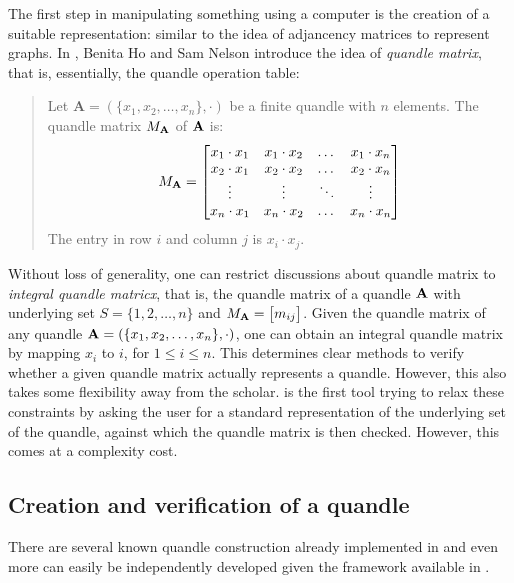 \documentclass{../mcom-l}
\begin{document}
The first step in manipulating something using a computer is the creation of a suitable representation: similar to the idea of adjancency matrices to represent graphs. In \cite{ho2005matrices}, Benita Ho and Sam Nelson introduce the idea of \emph{quandle matrix}, that is, essentially, the quandle operation table:
\begin{quote}
    Let $\mathbf{A}=(\{x_1, x_2, \dots, x_n\}, \cdot)$ be a finite quandle with $n$ elements. \newline 
    The quandle matrix $M_\mathbf{A}$ of $\mathbf{A}$ is:
    \[M_\mathbf{A} = \begin{bmatrix}
 x_1 \cdot x_1 & x_1 \cdot x_2 & \dots & x_1 \cdot x_n \\
 x_2 \cdot x_1 & x_2 \cdot x_2 & \dots & x_2 \cdot x_n\\
 \vdots & \vdots & \ddots & \vdots \\
 x_n \cdot x_1 & x_n \cdot x_2 & \dots & x_n \cdot x_n
\end{bmatrix}\]
The entry in row $i$ and column $j$ is $x_i \cdot x_j$\cite{ho2005matrices}.\newline
\end{quote}
Without loss of generality, one can restrict discussions about quandle matrix to \emph{integral quandle matricx}, that is, the quandle matrix of a quandle $\mathbf{A}$ with underlying set $S =\{1,2,\dots,n\}$ and $M_\mathbf{A} = \begin{bmatrix} m_{ij}\end{bmatrix}$. Given the quandle matrix of any quandle $\mathbf{A}=(\{x_1, x_2, \dots, x_n\}, \cdot)$, one can obtain an integral quandle matrix by mapping $x_i$ to $i$, for $1 \leq i \leq n$\cite{ho2005matrices}. This determines clear methods to verify whether a given quandle matrix actually represents a quandle. However, this also takes some flexibility away from the scholar.\newline
\Software is the first tool trying to relax these constraints by asking the user for a standard representation of the underlying set of the quandle, against which the quandle matrix is then checked. However, this comes at a complexity cost. 

\subsection{Creation and verification of a quandle}
There are several known quandle construction already implemented in \Software and even more can easily be independently developed given the framework available in \Software.
\end{document}

